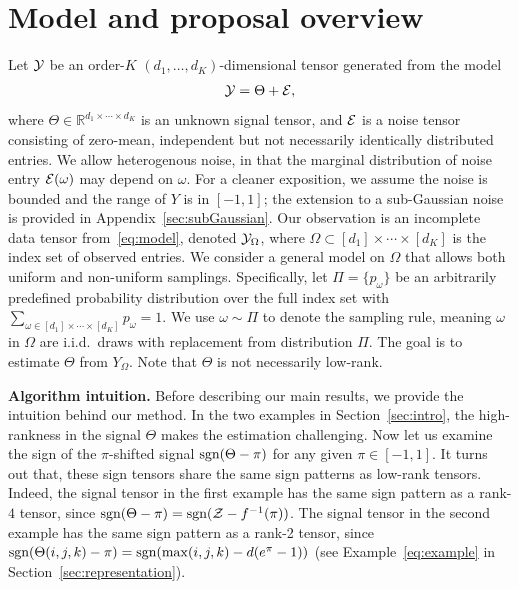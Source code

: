 \documentclass{article}
\theoremstyle{plain}
\theoremstyle{definition}
\def\sign{\textup{sgn}}
\begin{document}
\section{Model and proposal overview}\label{sec:overview}
Let $\mathcal{Y}$ be an order-$K$ $(d_1,\ldots,d_K)$-dimensional tensor generated from the model
\begin{equation}\label{eq:model}
\mathcal{Y}=\Theta+\mathcal{E},
\end{equation}
where $\Theta\in\mathbb{R}^{d_1\times \cdots \times d_K}$ is an unknown signal tensor, and $\mathcal{E}$ is a noise tensor consisting of zero-mean, independent but not necessarily identically distributed entries. We allow heterogenous noise, in that the marginal distribution of noise entry $\mathcal{E}(\omega)$ may depend on $\omega$. For a cleaner exposition, we assume the noise is bounded and the range of $Y$ is in $[-1,1]$; the extension to a sub-Gaussian noise is provided in Appendix~\ref{sec:subGaussian}. Our observation is an incomplete data tensor from~\eqref{eq:model}, denoted  $\mathcal{Y}_\Omega$, where $\Omega\subset[d_1]\times\cdots\times[d_K]$ is the index set of observed entries. We consider a general model on $\Omega$ that allows both uniform and non-uniform samplings. Specifically, let $\Pi=\{p_\omega\}$ be an arbitrarily predefined probability distribution over the full index set with $\sum_{\omega\in[d_1]\times \cdots \times [d_K]}p_\omega=1$. We use $\omega\sim \Pi$ to denote the sampling rule, meaning $\omega$ in $\Omega$ are i.i.d.\ draws with replacement from distribution $\Pi$. The goal is to estimate $\Theta$ from $Y_{\Omega}$. Note that $\Theta$ is not necessarily low-rank. 

{\bf Algorithm intuition.} Before describing our main results, we provide the intuition behind our method. In the two examples in Section~\ref{sec:intro}, the high-rankness in the signal $\Theta$ makes the estimation challenging. Now let us examine the sign of the $\pi$-shifted signal $\sign(\Theta-\pi)$ for any given $\pi\in[-1,1]$. It turns out that, these sign tensors share the same sign patterns as low-rank tensors. Indeed, the signal tensor in the first example has the same sign pattern as a rank-$4$ tensor, since $\sign(\Theta-\pi)=\sign(\tZ-f^{-1}(\pi))$. The signal tensor in the second example has the same sign pattern as a rank-2 tensor, since $\sign(\Theta(i,j,k)-\pi)=\sign(\max(i,j,k)-d(e^{\pi}-1))$ (see Example~\ref{eq:example} in Section~\ref{sec:representation}).
\end{document}
